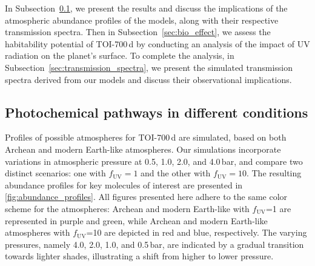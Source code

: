In Subsection~\ref{sec:photoclima}, we present the results and discuss the implications of the atmospheric abundance profiles of the models, along with their respective transmission spectra. Then in Subsection~\ref{sec:bio_effect}, we  assess the habitability potential of TOI-700\,d by conducting an analysis of the impact of UV radiation on the planet's surface. To complete the analysis, in Subsection~\ref{sec:transmission_spectra}, we present the simulated transmission spectra derived from our models and discuss their observational implications.

\subsection{Photochemical pathways in different conditions} \label{sec:photoclima}

Profiles of possible atmospheres for TOI-700\,d are simulated, based on both Archean and modern Earth-like atmospheres. Our simulations incorporate variations in atmospheric pressure at 0.5, 1.0, 2.0, and 4.0\,bar, and compare two distinct scenarios: one with $f_\mathrm{UV}=1$ and the other with $f_\mathrm{UV}=10$. The resulting abundance profiles for key molecules of interest are presented in \autoref{fig:abundance_profiles}. 
All figures presented here adhere to the same color scheme for the atmospheres: Archean and modern Earth-like with $f_\mathrm{UV}$=1 are represented in purple and green, while Archean and modern Earth-like atmospheres with $f_\mathrm{UV}$=10 are depicted in red and blue, respectively. The varying pressures, namely 4.0, 2.0, 1.0, and 0.5\,bar, are indicated by a gradual transition towards lighter shades, illustrating a shift from higher to lower pressure. 

